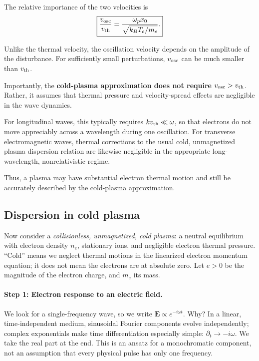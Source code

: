 \documentclass[11pt]{article}
\begin{document}
The relative importance of the two velocities is
\begin{equation}
\boxed{
\frac{v_{\rm osc}}{v_{\rm th}}
=
\frac{\omega_p x_0}{\sqrt{k_B T_e/m_e}}.
}
\end{equation}

Unlike the thermal velocity, the oscillation velocity depends
on the amplitude of the disturbance. For sufficiently small
perturbations, $v_{\rm osc}$ can be much smaller than
$v_{\rm th}$.

Importantly, the \textbf{cold-plasma approximation does not
require $v_{\rm osc}>v_{\rm th}$}. Rather, it assumes that
thermal pressure and velocity-spread effects are negligible
in the wave dynamics.

For longitudinal waves, this typically requires
$k v_{\rm th}\ll\omega$, so that electrons do not move
appreciably across a wavelength during one oscillation.
For transverse electromagnetic waves, thermal corrections
to the usual cold, unmagnetized plasma dispersion relation
are likewise negligible in the appropriate long-wavelength,
nonrelativistic regime.

Thus, a plasma may have substantial electron thermal
motion and still be accurately described by the
cold-plasma approximation.


\subsection{Dispersion in cold plasma}
Now consider a \emph{collisionless, unmagnetized, cold plasma}: a neutral equilibrium with electron density $n_e$, stationary ions, and negligible electron thermal pressure. ``Cold'' means we neglect thermal motions in the linearized electron momentum equation; it does not mean the electrons are at absolute zero. Let $e>0$ be the magnitude of the electron charge, and $m_e$ its mass.

\paragraph{Step 1: Electron response to an electric field.}
We look for a single-frequency wave, so we write $\mathbf E\propto e^{-i\omega t}$. Why? In a linear, time-independent medium, sinusoidal Fourier components evolve independently; complex exponentials make time differentiation especially simple: $\partial_t\to-i\omega$. We take the real part at the end. This is an ansatz for a monochromatic component, not an assumption that every physical pulse has only one frequency.
\end{document}

